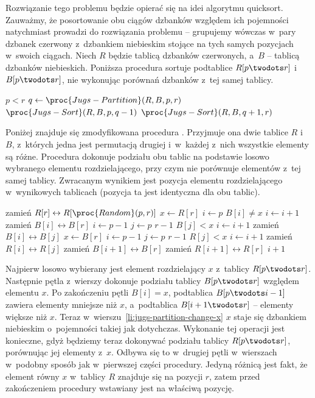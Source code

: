 \subproblem %
Rozwiązanie tego problemu będzie opierać się na idei algorytmu quicksort. Zauważmy, że posortowanie obu ciągów dzbanków względem ich pojemności natychmiast prowadzi do rozwiązania problemu -- grupujemy wówczas w~pary dzbanek czerwony z~dzbankiem niebieskim stojące na tych samych pozycjach w~swoich ciągach. Niech $R$ będzie tablicą dzbanków czerwonych, a~$B$ -- tablicą dzbanków niebieskich. Poniższa procedura sortuje podtablice $R[p\twodots r]$ i~$B[p\twodots r]$, nie wykonując porównań dzbanków z~tej samej tablicy.
\begin{codebox}
\li	\If $p<r$
\li		\Then
			$q\gets\proc{Jugs-Partition}(R,B,p,r)$
\li			$\proc{Jugs-Sort}(R,B,p,q-1)$
\li			$\proc{Jugs-Sort}(R,B,q+1,r)$
		\End
\end{codebox}

Poniżej znajduje się zmodyfikowana procedura . Przyjmuje ona dwie tablice $R$ i~$B$, z~których jedna jest permutacją drugiej i~w~każdej z~nich wszystkie elementy są różne. Procedura dokonuje podziału obu tablic na podstawie losowo wybranego elementu rozdzielającego, przy czym nie porównuje elementów z~tej samej tablicy. Zwracanym wynikiem jest pozycja elementu rozdzielającego w~wynikowych tablicach (pozycja ta jest identyczna dla obu tablic).
\begin{codebox}
\li	zamień $R[r]\leftrightarrow R[\proc{Random}(p,r)]$
\li	$x\gets R[r]$
\li	$i\gets p$
\li	\While $B[i]\ne x$
\li		\Do $i\gets i+1$
		\End
\li	zamień $B[i]\leftrightarrow B[r]$
\li	$i\gets p-1$
\li	\For $j\gets p$ \To $r-1$ \label{li:jugs-partition-for1-begin}
\li		\Do
			\If $B[j]<x$
\li				\Then
					$i\gets i+1$
\li					zamień $B[i]\leftrightarrow B[j]$
				\End
		\End \label{li:jugs-partition-for1-end}
\li	$x\gets B[r]$ \label{li:jugs-partition-change-x}
\li	$i\gets p-1$
\li	\For $j\gets p$ \To $r-1$ \label{li:jugs-partition-for2-begin}
\li		\Do
			\If $R[j]<x$
\li				\Then
					$i\gets i+1$
\li					zamień $R[i]\leftrightarrow R[j]$
				\End
		\End \label{li:jugs-partition-for2-end}
\li	zamień $B[i+1]\leftrightarrow B[r]$
\li	zamień $R[i+1]\leftrightarrow R[r]$
\li	\Return $i+1$
\end{codebox}
Najpierw losowo wybierany jest element rozdzielający $x$ z~tablicy $R[p\twodots r]$. Następnie pętla  z~wierszy \twodashes{\ref{li:jugs-partition-for1-begin}}{\ref{li:jugs-partition-for1-end}} dokonuje podziału tablicy $B[p\twodots r]$ względem elementu $x$. Po zakończeniu pętli $B[i]=x$, podtablica $B[p\twodots i-1]$ zawiera elementy mniejsze niż $x$, a~podtablica $B[i+1\twodots r]$ -- elementy większe niż $x$. Teraz w~wierszu~\ref{li:jugs-partition-change-x} $x$ staje się dzbankiem niebieskim o~pojemności takiej jak dotychczas. Wykonanie tej operacji jest konieczne, gdyż będziemy teraz dokonywać podziału tablicy $R[p\twodots r]$, porównując jej elementy z~$x$. Odbywa się to w~drugiej pętli  w~wierszach \twodashes{\ref{li:jugs-partition-for2-begin}}{\ref{li:jugs-partition-for2-end}} w~podobny sposób jak w~pierwszej części procedury. Jedyną różnicą jest fakt, że element równy $x$ w~tablicy $R$ znajduje się na pozycji $r$, zatem przed zakończeniem procedury wstawiany jest na właściwą pozycję.

